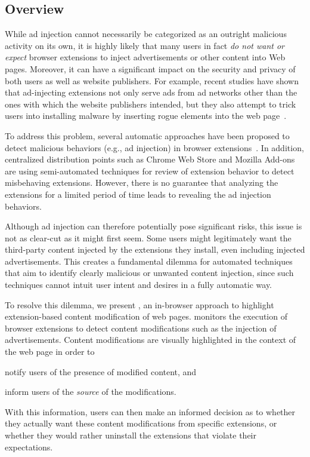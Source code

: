 \subsection{Overview}
\label{adinjection:sec:intro}

While ad injection cannot necessarily be categorized as an outright malicious
activity on its own, it is highly likely that many users in fact \emph{do not
want or expect} browser extensions to inject advertisements or other content
into Web pages. Moreover, it can have a significant impact on the security and
privacy of both users as well as website publishers. For example, recent studies
have shown that ad-injecting extensions not only serve ads from ad networks
other than the ones with which the website publishers intended, but they also
attempt to trick users into installing malware by inserting rogue elements into
the web page~\cite{sp2015adinjection,www2015adinjection}.

To address this problem, several automatic approaches have been proposed to
detect malicious behaviors (e.g., ad injection) in browser
extensions~\cite{www2015adinjection,usenixsec2014hulk,usenixsec2015webeval}. In
addition, centralized distribution points such as Chrome Web Store and Mozilla
Add-ons are using semi-automated techniques for review of extension behavior to
detect misbehaving extensions. However, there is no guarantee that analyzing the
extensions for a limited period of time leads to revealing the ad injection
behaviors.

Although ad injection can therefore potentially pose significant risks, this
issue is not as clear-cut as it might first seem. Some users might legitimately
want the third-party content injected by the extensions they install, even
including injected advertisements. This creates a fundamental dilemma for
automated techniques that aim to identify clearly malicious or unwanted content
injection, since such techniques cannot intuit user intent and desires in a
fully automatic way.

To resolve this dilemma, we present \origintracer, an in-browser approach to
highlight extension-based content modification of web pages. \origintracer
monitors the execution of browser extensions to detect content modifications
such as the injection of advertisements. Content modifications are visually
highlighted in the context of the web page in order to
\begin{inparaenum}
     \item notify users of the presence of modified content, and
     \item inform users of the \emph{source} of the modifications.
\end{inparaenum}
With this information, users can then make an informed decision as to whether
they actually want these content modifications from specific extensions, or
whether they would rather uninstall the extensions that violate their
expectations.

